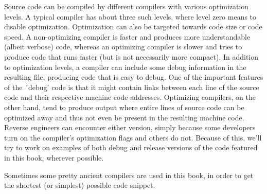 Source code can be compiled by different compilers with various optimization levels.
A typical compiler has about three such levels, where level zero means to disable optimization.
Optimization can also be targeted towards code size or code speed.
A non-optimizing compiler is faster and produces more understandable (albeit verbose) code,
whereas an optimizing compiler is slower and tries to produce code that runs faster (but is not necessarily more compact).
In addition to optimization levels, a compiler can include some debug information in the resulting file,
producing code that is easy to debug.
One of the important features of the ´debug' code is that it might contain links
between each line of the source code and their respective machine code addresses.
Optimizing compilers, on the other hand, tend to produce output where entire lines of source code
can be optimized away and thus not even be present in the resulting machine code.
Reverse engineers can encounter either version, simply because some developers turn on the compiler's optimization flags and others do not.
Because of this, we'll try to work on examples of both debug and release versions of the code featured in this book, wherever possible.

Sometimes some pretty ancient compilers are used in this book, in order to get the shortest (or simplest) possible code snippet.
